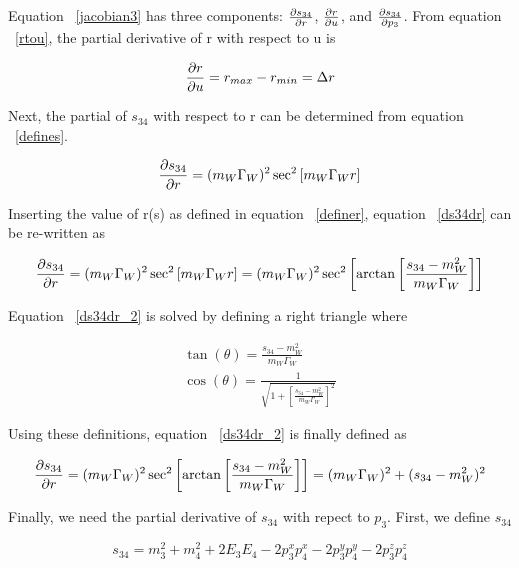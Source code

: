 Equation ~\ref{jacobian3} has three components: $\frac{\partial s_{34}}{\partial r}$,
$\frac{\partial r}{\partial u}$, and $\frac{\partial s_{34}}{\partial p_{3}}$. From equation ~\ref{rtou}, the
partial derivative of r with respect to u is 

\begin{equation}
\label{drdu}
\frac{\partial r}{\partial u} = r_{max} - r_{min} = \Delta r
\end{equation}

Next, the partial of $s_{34}$ with respect to r can be determined from equation
~\ref{defines}.


\begin{equation}
\label{ds34dr}
\frac{\partial s_{34}}{\partial r} = (m_{W} \Gamma_{W})^{2} \sec^{2} \left[m_{W} \Gamma_{W} r \right]
\end{equation}

Inserting the value of r(s) as defined in equation ~\ref{definer}, equation
~\ref{ds34dr} can be re-written as

\begin{equation}
\label{ds34dr_2}
\frac{\partial s_{34}}{\partial r} = (m_{W} \Gamma_{W})^{2} \sec^{2} \left[m_{W} \Gamma_{W} r \right] =
(m_{W} \Gamma_{W})^{2} \sec^{2} \left[\arctan \left[ \frac{s_{34} - m_{W}^{2}}{m_{W}
\Gamma_{W}}  \right] \right]
\end{equation}

Equation ~\ref{ds34dr_2} is solved by defining a right triangle where

\begin{eqnarray}
\nonumber
\tan(\theta) = \frac{s_{34}-m_{W}^{2}}{m_{W}\Gamma_{W}} \\
\cos(\theta) = \frac{1}{\sqrt{1+\left[ \frac{s_{34}-m_{W}^{2}}{m_{W}\Gamma_{W}}
\right]^{2}}}
\end{eqnarray}

Using these definitions, equation ~\ref{ds34dr_2} is finally defined as

\begin{equation}
\label{ds34dr_3}
\frac{\partial s_{34}}{\partial r} = (m_{W} \Gamma_{W})^{2} \sec^{2} \left[\arctan \left[ \frac{s_{34} - m_{W}^{2}}{m_{W}
\Gamma_{W}}  \right] \right] = (m_{W}\Gamma_{W})^{2} + (s_{34} - m_{W}^{2})^{2}
\end{equation}

Finally, we need the partial derivative of $s_{34}$ with repect to
$p_{3}$. First, we define $s_{34}$

\begin{equation}
\label{defines34}
s_{34} = m_{3}^{2} + m_{4}^{2} + 2E_{3}E_{4} - 2p_{3}^{x}p_{4}^{x} - 2p_{3}^{y}p_{4}^{y} - 2p_{3}^{z}p_{4}^{z}
\end{equation}

